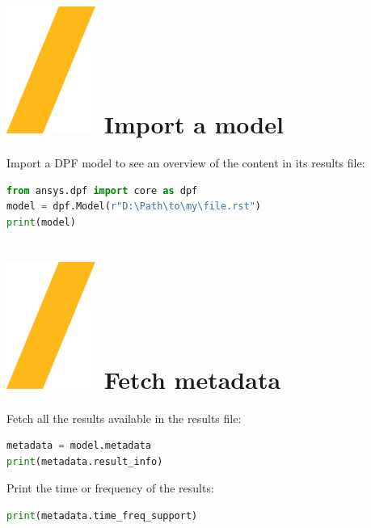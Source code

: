 \documentclass[9pt,landscape]{article}
\begin{document}
\begin{multicols}{3}
\setlength{\premulticols}{1pt}
\setlength{\postmulticols}{1pt}
\setlength{\multicolsep}{1pt}
\setlength{\columnsep}{2pt}


\section{\includegraphics[height=\fontcharht\font`\S]{slash.png} Import a model}
Import a DPF model to see an overview of the content in its results file:
\begin{lstlisting}[language=Python]
from ansys.dpf import core as dpf
model = dpf.Model(r"D:\Path\to\my\file.rst")
print(model)
\end{lstlisting}


\section{\includegraphics[height=\fontcharht\font`\S]{slash.png} Fetch metadata}
Fetch all the results available in the results file:
\begin{lstlisting}[language=Python]
metadata = model.metadata
print(metadata.result_info)
\end{lstlisting}

Print the time or frequency of the results:
\begin{lstlisting}[language=Python]
print(metadata.time_freq_support)
\end{lstlisting}


\end{multicols}
\end{document}
